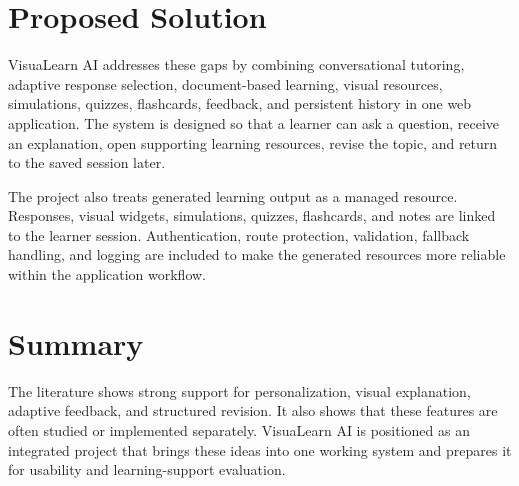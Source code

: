 \section[Proposed Solution]{\textbf{Proposed Solution}}

VisuaLearn AI addresses these gaps by combining conversational tutoring, adaptive response selection, document-based learning, visual resources, simulations, quizzes, flashcards, feedback, and persistent history in one web application. The system is designed so that a learner can ask a question, receive an explanation, open supporting learning resources, revise the topic, and return to the saved session later.

The project also treats generated learning output as a managed resource. Responses, visual widgets, simulations, quizzes, flashcards, and notes are linked to the learner session. Authentication, route protection, validation, fallback handling, and logging are included to make the generated resources more reliable within the application workflow.

\section[Summary]{\textbf{Summary}}

The literature shows strong support for personalization, visual explanation, adaptive feedback, and structured revision. It also shows that these features are often studied or implemented separately. VisuaLearn AI is positioned as an integrated project that brings these ideas into one working system and prepares it for usability and learning-support evaluation.

